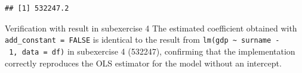 \documentclass[
]{article}
\begin{document}
\begin{verbatim}
## [1] 532247.2
\end{verbatim}

Verification with result in subexercise 4 The estimated coefficient
obtained with \texttt{add\_constant\ =\ FALSE} is identical to the
result from
\texttt{lm(gdp\ \textasciitilde{}\ surname\ -\ 1,\ data\ =\ df)} in
subexercise 4 (532247), confirming that the implementation correctly
reproduces the OLS estimator for the model without an intercept.
\end{document}
